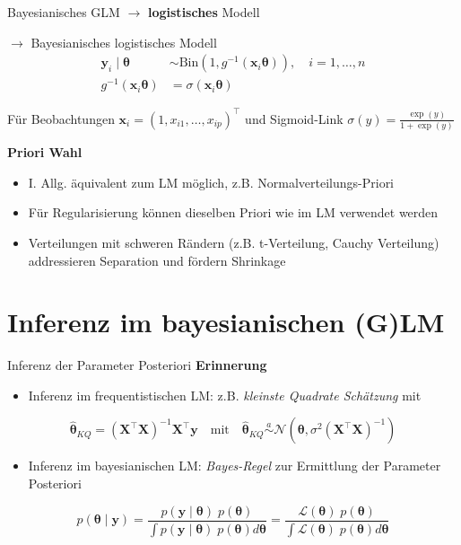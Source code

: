 \documentclass[
  ignorenonframetext,
  aspectratio=169,
]{beamer}
\providecommand{\tightlist}{%
  \setlength{\itemsep}{0pt}\setlength{\parskip}{0pt}}
\newcommand{\bx}{\bm{x}}
\newcommand{\by}{\bm{y}}
\newcommand{\bX}{\bm{X}}
\newcommand{\Lcal}{\mathcal{L}}
\newcommand{\Ncal}{\mathcal{N}}
\newcommand{\ssd}{\sigma^2}
\newcommand{\btheta}{\bm{\theta}}
\newcommand{\hbtheta}{\hat{\bm{\theta}}}
\begin{document}
\begin{frame}{Bayesianisches GLM \(\to\) \textbf{logistisches} Modell}
\protect{}\label{bayesianisches-glm-to-logistisches-modell}
\begin{block}{\(\to\) Bayesianisches logistisches Modell}
\protect{}\label{to-bayesianisches-logistisches-modell}
\[
\begin{aligned}
  \by_i \mid \btheta &\sim \text{Bin}(1, g^{-1}(\bx_i \btheta)), \quad i = 1, \dots, n \\
  g^{-1}(\bx_i \btheta) &= \sigma(\bx_i \btheta)
\end{aligned}
\]

Für Beobachtungen \(\bx_i = (1, x_{i1}, \dots, x_{ip})^\top\) und
Sigmoid-Link \(\sigma(y) = \frac{\exp(y)}{1 + \exp(y)}\)
\end{block}

\textbf{Priori Wahl}

\begin{itemize}
\tightlist
\item
  I. Allg. äquivalent zum LM möglich, z.B. Normalverteilungs-Priori
\item
  Für Regularisierung können dieselben Priori wie im LM verwendet werden
  \autocite{ohara_review_2009,fahrmeir_bayesian_2010,van_erp_shrinkage_2019}
\item
  Verteilungen mit schweren Rändern (z.B. t-Verteilung, Cauchy
  Verteilung) addressieren Separation und fördern Shrinkage
  \autocite{gelman_weakly_2008,ghosh_use_2017}
\end{itemize}
\end{frame}

\section{Inferenz im bayesianischen
(G)LM}\label{inferenz-im-bayesianischen-glm}

\begin{frame}{Inferenz der Parameter Posteriori}
\protect{}\label{inferenz-der-parameter-posteriori}
\textbf{Erinnerung}

\begin{itemize}
\tightlist
\item
  Inferenz im frequentistischen LM: z.B. \emph{kleinste Quadrate
  Schätzung} mit
\end{itemize}

\[
\hbtheta_{KQ} = (\bX^\top \bX)^{-1} \bX^\top \by \quad \text{mit} \quad \hbtheta_{KQ} \overset{a}{\sim} \Ncal(\btheta, \ssd (\bX^\top \bX)^{-1})
\]

\begin{itemize}
\tightlist
\item
  Inferenz im bayesianischen LM: \emph{Bayes-Regel} zur Ermittlung der
  Parameter Posteriori
\end{itemize}

\[
p(\btheta \mid \by) = \frac{p(\by \mid \btheta) \; p(\btheta)}{\int p(\by \mid \btheta) \; p(\btheta) d \btheta}
= \frac{\Lcal(\btheta) \; p(\btheta)}{\int \Lcal(\btheta) \; p(\btheta) d \btheta}
\]
\end{frame}
\end{document}

